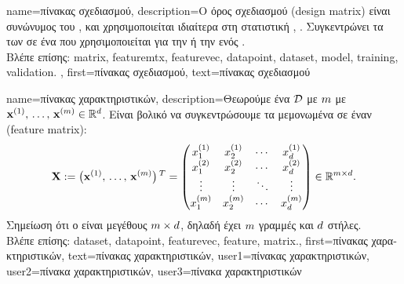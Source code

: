 {name={\foreignlanguage{greek}{πίνακας σχεδιασμού}},
	description={\foreignlanguage{greek}{Ο όρος}  
		\foreignlanguage{greek}{σχεδιασμού} (design matrix) \foreignlanguage{greek}{είναι συνώνυμος του}  
 		, \foreignlanguage{greek}{και χρησιμοποιείται ιδιαίτερα στη στατιστική} 
		\cite{OxfordStatisticsDictionary}, \cite{Everitt2022}. 
 		\foreignlanguage{greek}{Συγκεντρώνει τα}  \foreignlanguage{greek}{των}  
		\foreignlanguage{greek}{σε ένα}  \foreignlanguage{greek}{που χρησιμοποιείται για την}
 		 \foreignlanguage{greek}{ή την}  \foreignlanguage{greek}{ενός} .
		\\
		\foreignlanguage{greek}{Βλέπε επίσης:} \gls{matrix}, \gls{featuremtx}, \gls{featurevec}, \gls{datapoint}, \gls{dataset}, \gls{model}, 
		\gls{training}, \gls{validation}. }, 
 	first={\foreignlanguage{greek}{πίνακας σχεδιασμού}},
 	text={\foreignlanguage{greek}{πίνακας σχεδιασμού}} 
}

{name={\foreignlanguage{greek}{πίνακας χαρακτηριστικών}}, 
	description={\foreignlanguage{greek}{Θεωρούμε ένα}  
		$\mathcal{D}$ \foreignlanguage{greek}{με} $m$  \foreignlanguage{greek}{με}  
		${\bf x}^{(1)}, \,\ldots, \,{\bf x}^{(m)} \in \mathbb{R}^{d}$. 
		\foreignlanguage{greek}{Εί\-ναι βολικό να συγκεντρώσουμε τα μεμονωμένα}  
		 \foreignlanguage{greek}{σε έναν}   (feature matrix):
		$${\bf X} := \big({\bf x}^{(1)}, \,\ldots, \,{\bf x}^{(m)}\big)\,^{T} =
		\begin{pmatrix}
			x^{(1)}_{1} & x^{(1)}_{2} & \cdots & x^{(1)}_{d} \\
			x^{(2)}_{1} & x^{(2)}_{2} & \cdots & x^{(2)}_{d} \\
			\vdots      & \vdots      & \ddots & \vdots \\
			x^{(m)}_{1} & x^{(m)}_{2} & \cdots & x^{(m)}_{d}
		\end{pmatrix}
		\in \mathbb{R}^{m \times d}.$$
		\foreignlanguage{greek}{Σημείωση ότι ο}   \foreignlanguage{greek}{είναι μεγέθους 
		$m \times d$, δηλαδή έχει $m$ γραμμές και $d$ στήλες}.
		\\
		\foreignlanguage{greek}{Βλέπε επίσης:} \gls{dataset}, \gls{datapoint}, \gls{featurevec}, \gls{feature}, \gls{matrix}.},
	first={\foreignlanguage{greek}{πίνακας χαρακτηριστικών}},
	text={\foreignlanguage{greek}{πίνακας χαρακτηριστικών}},
	user1={\foreignlanguage{greek}{πίνακας χαρακτηριστικών}}, %
  	user2={\foreignlanguage{greek}{πίνακα χαρακτηριστικών}}, %
	user3={\foreignlanguage{greek}{πίνακα χαρακτηριστικών}} %
}

